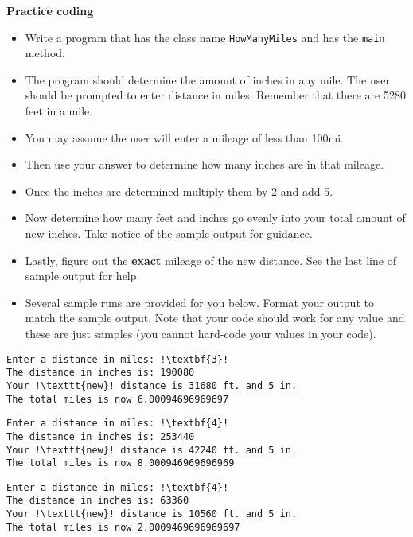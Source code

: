 \documentclass[12pt]{article}
\begin{document}
\vspace*{0.5cm}
\textbf{Practice coding}
\begin{itemize}
	\item Write a program that has the class name \texttt{HowManyMiles} and has the \texttt{main} method.
	\item The program should determine the amount of inches in any mile. The user should be prompted to enter distance in miles. Remember that there are 5280 feet in a mile.
	\item You may assume the user will enter a mileage of less than 100mi.
	\item Then use your answer to determine how many inches are in that mileage.
	\item Once the inches are determined multiply them by 2 and add 5.
	\item Now determine how many feet and inches go evenly into your total amount of new inches. Take notice of the sample output for guidance.
	\item Lastly, figure out the \textbf{exact} mileage of the new distance. See the last line of sample output for help.
	\item Several sample runs are provided for you below. Format your output to match the sample output. Note that your code should work for any value and these are just samples (you cannot hard-code your values in your code).
\end{itemize}
\begin{center}
\begin{minipage}{7cm}
\begin{lstlisting}[escapechar=!]
Enter a distance in miles: !\textbf{3}!
The distance in inches is: 190080
Your !\texttt{new}! distance is 31680 ft. and 5 in.
The total miles is now 6.00094696969697
\end{lstlisting}
\end{minipage}
\hspace*{0.5cm}
\begin{minipage}{7cm}
\begin{lstlisting}[escapechar=!]
Enter a distance in miles: !\textbf{4}!
The distance in inches is: 253440
Your !\texttt{new}! distance is 42240 ft. and 5 in.
The total miles is now 8.000946969696969
\end{lstlisting}
\end{minipage}
\hspace*{0.5cm}
\begin{minipage}{7cm}
\begin{lstlisting}[escapechar=!]
Enter a distance in miles: !\textbf{4}!
The distance in inches is: 63360
Your !\texttt{new}! distance is 10560 ft. and 5 in.
The total miles is now 2.0009469696969697
\end{lstlisting}
\end{minipage}
\end{center}
	
\end{document}
